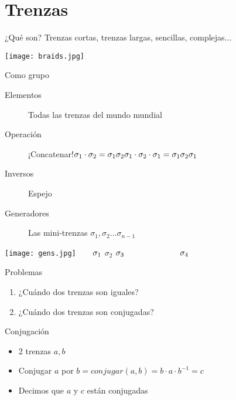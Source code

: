 \documentclass[10pt]{beamer}
\newcommand\tab[1][0.6cm]{\hspace*{#1}}
\newcommand\supertab[1][2.9cm]{\hspace*{#1}}
\begin{document}
\section{Trenzas}

\begin{frame}{¿Qué son?}
	Trenzas cortas, trenzas largas, sencillas, complejas... \newline 

	\texttt{[image: braids.jpg]}
	
\end{frame}


\begin{frame}{Como grupo}
	\begin{description}
		\item[Elementos]  Todas las trenzas del mundo mundial 
		\item[Operación] ¡Concatenar!\newline $\sigma_1 \cdot \sigma_2 = \sigma_1\sigma_2
		\newline \sigma_1\cdot \sigma_2\cdot \sigma_1 = \sigma_1\sigma_2\sigma_1$
		\item[Inversos] Espejo
		\item[Generadores] Las mini-trenzas $\sigma_1, \sigma_2 \ldots \sigma_{n-1}$
		
	\end{description}
	\texttt{[image: gens.jpg]}\newline
	$\tab \sigma_1$ \supertab $\sigma_2$ \supertab $\sigma_3 \tab\tab\tab\tab \sigma_4$
\end{frame}

\begin{frame}{Problemas}
	\begin{enumerate}
		\item ¿Cuándo dos trenzas son iguales?
		\item ¿Cuándo dos trenzas son conjugadas?
	\end{enumerate}
	\begin{exampleblock}{Conjugación }
		\begin{itemize}
			\item 2 trenzas $a, b$ 
			\item Conjugar $a$ por $b = conjugar(a, b) = b\cdot a\cdot b^{-1} = c$ 
			\item Decimos que $a$ y $c$ están conjugadas
		\end{itemize}
	\end{exampleblock}
\end{frame}
\end{document}
